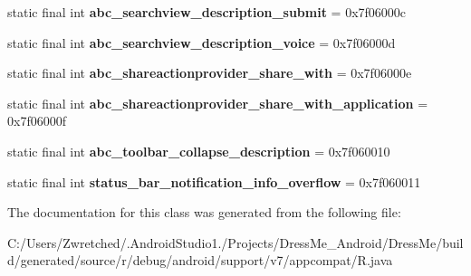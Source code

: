 \begin{DoxyCompactItemize}
\item 
\hypertarget{classandroid_1_1support_1_1v7_1_1appcompat_1_1_r_1_1string_ae42251191872922dcd3e42a02b86f36c}{}static final int {\bfseries abc\+\_\+searchview\+\_\+description\+\_\+submit} = 0x7f06000c\label{classandroid_1_1support_1_1v7_1_1appcompat_1_1_r_1_1string_ae42251191872922dcd3e42a02b86f36c}

\item 
\hypertarget{classandroid_1_1support_1_1v7_1_1appcompat_1_1_r_1_1string_af44447786247cf4c993ba7d749a18d7b}{}static final int {\bfseries abc\+\_\+searchview\+\_\+description\+\_\+voice} = 0x7f06000d\label{classandroid_1_1support_1_1v7_1_1appcompat_1_1_r_1_1string_af44447786247cf4c993ba7d749a18d7b}

\item 
\hypertarget{classandroid_1_1support_1_1v7_1_1appcompat_1_1_r_1_1string_ada3024d7f8a977c5a49a8cab63c26f27}{}static final int {\bfseries abc\+\_\+shareactionprovider\+\_\+share\+\_\+with} = 0x7f06000e\label{classandroid_1_1support_1_1v7_1_1appcompat_1_1_r_1_1string_ada3024d7f8a977c5a49a8cab63c26f27}

\item 
\hypertarget{classandroid_1_1support_1_1v7_1_1appcompat_1_1_r_1_1string_acd327651d6f2bbab98396d2967431584}{}static final int {\bfseries abc\+\_\+shareactionprovider\+\_\+share\+\_\+with\+\_\+application} = 0x7f06000f\label{classandroid_1_1support_1_1v7_1_1appcompat_1_1_r_1_1string_acd327651d6f2bbab98396d2967431584}

\item 
\hypertarget{classandroid_1_1support_1_1v7_1_1appcompat_1_1_r_1_1string_a399ac8dfa9600f2c34e5d9f2d3e78edb}{}static final int {\bfseries abc\+\_\+toolbar\+\_\+collapse\+\_\+description} = 0x7f060010\label{classandroid_1_1support_1_1v7_1_1appcompat_1_1_r_1_1string_a399ac8dfa9600f2c34e5d9f2d3e78edb}

\item 
\hypertarget{classandroid_1_1support_1_1v7_1_1appcompat_1_1_r_1_1string_a7cc8e172b664c63f22e7d64dab601204}{}static final int {\bfseries status\+\_\+bar\+\_\+notification\+\_\+info\+\_\+overflow} = 0x7f060011\label{classandroid_1_1support_1_1v7_1_1appcompat_1_1_r_1_1string_a7cc8e172b664c63f22e7d64dab601204}

\end{DoxyCompactItemize}


The documentation for this class was generated from the following file\+:\begin{DoxyCompactItemize}
\item 
C\+:/\+Users/\+Zwretched/.\+Android\+Studio1./\+Projects/\+Dress\+Me\+\_\+\+Android/\+Dress\+Me/build/generated/source/r/debug/android/support/v7/appcompat/R.\+java\end{DoxyCompactItemize}
